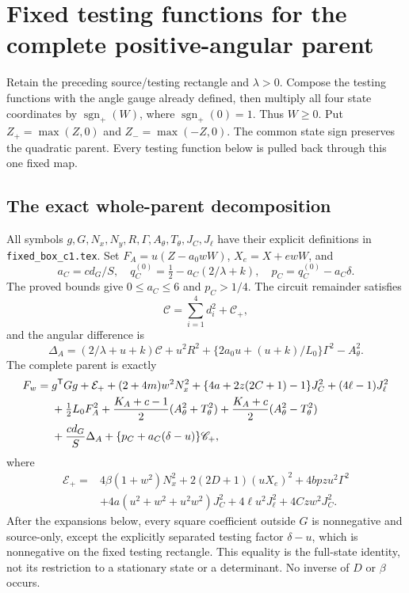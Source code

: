 \section{Fixed testing functions for the complete positive-angular parent}
Retain the preceding source/testing rectangle and $\lambda>0$.
Compose the testing functions with the angle gauge already defined, then
multiply all four state coordinates by $\operatorname{sgn}_+(W)$,
where $\operatorname{sgn}_+(0)=1$. Thus $W\ge0$.
Put $Z_+=\max(Z,0)$ and $Z_-=\max(-Z,0)$. The common state sign
preserves the quadratic parent. Every testing function below is pulled
back through this one fixed map.

\subsection{The exact whole-parent decomposition}

All symbols $g,G,N_x,N_y,R,\Gamma,A_\theta,T_\theta,J_C,J_\ell$
have their explicit definitions in \texttt{fixed\_box\_c1.tex}.
Set $F_A=u(Z-a_0wW)$, $X_e=X+ewW$, and
\[
 a_C=cd_G/S,\quad q_C^{(0)}=\tfrac12-a_C(2/\lambda+k),\quad
 p_C=q_C^{(0)}-a_C\delta.
\]
The proved bounds give $0\le a_C\le6$ and $p_C>1/4$.
The circuit remainder satisfies
\[
 \mathscr C=\sum_{i=1}^4d_i^2+\mathscr C_+,
\]
and the angular difference is
\[
 \Delta_A=(2/\lambda+u+k)\mathscr C+u^2R^2
       +\{2a_0u+(u+k)/L_0\}\Gamma^2-A_\theta^2.
\]
The complete parent is exactly
\begin{align*}
 F_w={}&g^{\mathsf T}Gg+\mathcal E_+
 +(2+4m)w^2N_x^2
 +\{4a+2z(2C+1)-1\}J_C^2+(4\ell-1)J_\ell^2\\
 &+\tfrac12L_0F_A^2
 +{K_A+c-1\over2}(A_\theta^2+T_\theta^2)
 +{K_A+c\over2}(A_\theta^2-T_\theta^2)\\
 &+{cd_G\over S}\Delta_A
 +\{p_C+a_C(\delta-u)\}\mathscr C_+,
\end{align*}
where
\[
\begin{split}
 \mathcal E_+={}&4\beta(1+w^2)N_x^2+2(2D+1)(uX_e)^2
                 +4bpzu^2\Gamma^2\\
 &+4a(u^2+w^2+u^2w^2)J_C^2+4\ell u^2J_\ell^2
                                             +4Czw^2J_C^2.
\end{split}
\]
After the expansions below, every square coefficient outside $G$
is nonnegative and source-only, except the explicitly separated
testing factor $\delta-u$, which is nonnegative on the fixed
testing rectangle. This equality
is the full-state identity, not its restriction to a stationary
state or a determinant. No inverse of $D$ or $\beta$ occurs.

